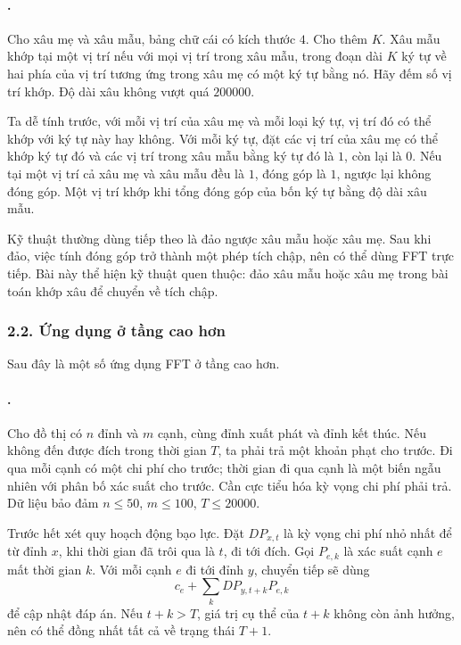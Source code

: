 \documentclass[11pt]{article}
\begin{document}
\paragraph{.}
Cho xâu mẹ và xâu mẫu, bảng chữ cái có kích thước \(4\). Cho thêm \(K\). Xâu
mẫu khớp tại một vị trí nếu với mọi vị trí trong xâu mẫu, trong đoạn dài
\(K\) ký tự về hai phía của vị trí tương ứng trong xâu mẹ có một ký tự bằng
nó. Hãy đếm số vị trí khớp. Độ dài xâu không vượt quá \(200000\).

Ta dễ tính trước, với mỗi vị trí của xâu mẹ và mỗi loại ký tự, vị trí đó có
thể khớp với ký tự này hay không. Với mỗi ký tự, đặt các vị trí của xâu mẹ có
thể khớp ký tự đó và các vị trí trong xâu mẫu bằng ký tự đó là \(1\), còn lại
là \(0\). Nếu tại một vị trí cả xâu mẹ và xâu mẫu đều là \(1\), đóng góp là
\(1\), ngược lại không đóng góp. Một vị trí khớp khi tổng đóng góp của bốn ký
tự bằng độ dài xâu mẫu.

Kỹ thuật thường dùng tiếp theo là đảo ngược xâu mẫu hoặc xâu mẹ. Sau khi đảo,
việc tính đóng góp trở thành một phép tích chập, nên có thể dùng FFT trực
tiếp. Bài này thể hiện kỹ thuật quen thuộc: đảo xâu mẫu hoặc xâu mẹ trong bài
toán khớp xâu để chuyển về tích chập.

\subsubsection*{2.2. Ứng dụng ở tầng cao hơn}

Sau đây là một số ứng dụng FFT ở tầng cao hơn.

\paragraph{.}
Cho đồ thị có \(n\) đỉnh và \(m\) cạnh, cùng đỉnh xuất phát và đỉnh kết thúc.
Nếu không đến được đích trong thời gian \(T\), ta phải trả một khoản phạt cho
trước. Đi qua mỗi cạnh có một chi phí cho trước; thời gian đi qua cạnh là một
biến ngẫu nhiên với phân bố xác suất cho trước. Cần cực tiểu hóa kỳ vọng chi
phí phải trả. Dữ liệu bảo đảm \(n\le 50\), \(m\le 100\), \(T\le 20000\).

Trước hết xét quy hoạch động bạo lực. Đặt \(DP_{x,t}\) là kỳ vọng chi phí nhỏ
nhất để từ đỉnh \(x\), khi thời gian đã trôi qua là \(t\), đi tới đích. Gọi
\(P_{e,k}\) là xác suất cạnh \(e\) mất thời gian \(k\). Với mỗi cạnh \(e\) đi
tới đỉnh \(y\), chuyển tiếp sẽ dùng
\[
  c_e+\sum_k DP_{y,t+k}P_{e,k}
\]
để cập nhật đáp án. Nếu \(t+k>T\), giá trị cụ thể của \(t+k\) không còn ảnh
hưởng, nên có thể đồng nhất tất cả về trạng thái \(T+1\).
\end{document}
